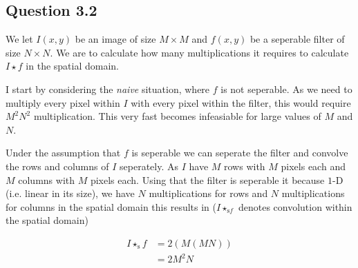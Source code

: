 \documentclass[a4paper, 10pt, final]{article}
\begin{document}



\newpage

\subsection*{Question 3.2}

We let $I(x,y)$ be an image of size $M \times M$ and $f(x,y)$ be a
seperable filter of size $N \times N$. We are to calculate how many
multiplications it requires to calculate $I \star f$ in the spatial
domain.

I start by considering the \emph{naive} situation, where $f$ is not
seperable. As we need to multiply every pixel within $I$ with every
pixel within the filter, this would require $M^{2}N^{2}$
multiplication. This very fast becomes infeasiable for large values of
$M$ and $N$.

Under the assumption that $f$ is seperable we can seperate the filter
and convolve the rows and columns of $I$ seperately. As $I$ have $M$
rows with $M$ pixels each and $M$ columns with $M$ pixels each. Using
that the filter is seperable it because $1$-D (i.e. linear in its
size), we have $N$ multiplications for rows and $N$ multiplications
for columns in the spatial domain this results in ($I
\star_{\textrm{s} f}$ denotes convolution within the spatial domain)

\begin{align*}
  I \star_{\textrm{s}} f & = 2(M(MN)) \\
  & = 2M^{2}N
\end{align*}
\end{document}
